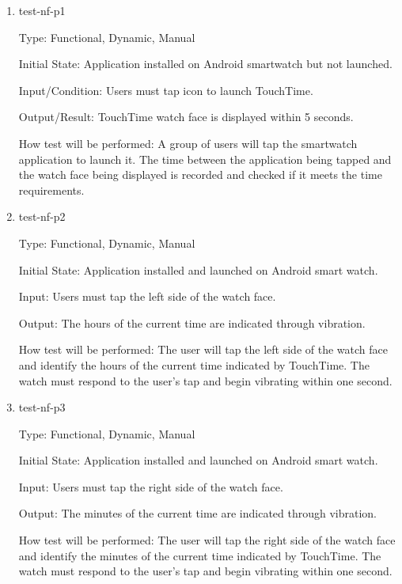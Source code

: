 \begin{enumerate}

\item{test-nf-p1\\}

Type: Functional, Dynamic, Manual
					
Initial State: Application installed on Android smartwatch but not launched.
					
Input/Condition: Users must tap icon to launch TouchTime.
					
Output/Result: TouchTime watch face is displayed within 5 seconds. 
					
How test will be performed: A group of users will tap the smartwatch application to launch it. The time between the application being tapped and the watch face being displayed is recorded and checked if it meets the time requirements.
					
\item{test-nf-p2\\}

Type: Functional, Dynamic, Manual
					
Initial State: Application installed and launched on Android smart watch. 
					
Input: Users must tap the left side of the watch face.
					
Output: The hours of the current time are indicated through vibration.
					
How test will be performed: The user will tap the left side of the watch face and identify the hours of the current time indicated by TouchTime. The watch must respond to the user's tap and begin vibrating within one second.

\item{test-nf-p3\\}

Type: Functional, Dynamic, Manual
					
Initial State: Application installed and launched on Android smart watch. 
					
Input: Users must tap the right side of the watch face.
					
Output: The minutes of the current time are indicated through vibration.
					
How test will be performed: The user will tap the right side of the watch face and identify the minutes of the current time indicated by TouchTime. The watch must respond to the user's tap and begin vibrating within one second.


\end{enumerate}
